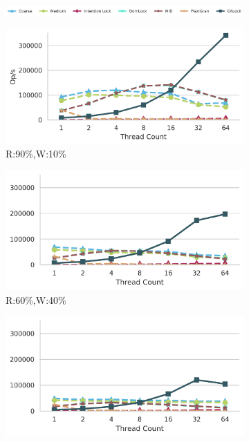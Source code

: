 \begin{figure}[ht]
	\centering
	\captionsetup{justification=centering}
	\begin{subfigure}[b]{\textwidth}
		\centering
		\includegraphics[width=\textwidth]{figures/PerformanceCharts/Legend}
	\end{subfigure}
	\begin{subfigure}{.33\textwidth}
		\includegraphics[width=\textwidth]{figures/PerformanceCharts/ReadWithoutModificationsThroughput}
		\caption{R:90\%,W:10\%}
		\label{rwm}
	\end{subfigure}
	\begin{subfigure}{.32\textwidth}
		\includegraphics[width=\textwidth]{figures/PerformanceCharts/BalancedWithoutModificationsThroughput}
		\caption{R:60\%,W:40\%}
		\label{bwm}
	\end{subfigure}
	\begin{subfigure}{.32\textwidth}
		\includegraphics[width=\textwidth]{figures/PerformanceCharts/WriteWithoutModificationsThroughput}

\end{subfigure}
\end{figure}
